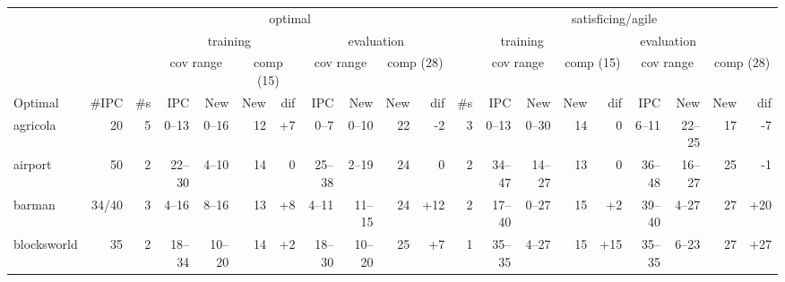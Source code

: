 \documentclass{article}
\begin{document}
                
                        \begin{table} \centering \scriptsize \setlength{\tabcolsep}{2pt}
                        \begin{tabular}{l@{}rr|rrrr|rrrr|r|rrrr|rrrr}
& & \multicolumn{9}{c}{optimal} & \multicolumn{9}{c}{satisficing/agile} \\
\cmidrule[\lightrulewidth](){3-11}
\cmidrule[\lightrulewidth](l){12-20}
& & & \multicolumn{4}{c}{training} & \multicolumn{4}{c}{evaluation} & \multicolumn{4}{c}{training} & \multicolumn{4}{c}{evaluation}\\
\cmidrule[\lightrulewidth](){4-7}
\cmidrule[\lightrulewidth](l){8-11}
\cmidrule[\lightrulewidth](){13-16}
\cmidrule[\lightrulewidth](l){17-20}
& & & \multicolumn{2}{c}{cov range} & \multicolumn{2}{c}{comp (15)} & \multicolumn{2}{c}{cov range} & \multicolumn{2}{c}{comp (28)} & & \multicolumn{2}{c}{cov range} & \multicolumn{2}{c}{comp (15)} & \multicolumn{2}{c}{cov range} & \multicolumn{2}{c}{comp (28)} \\
\cmidrule[\lightrulewidth](){4-5}
\cmidrule[\lightrulewidth](l){6-7}
\cmidrule[\lightrulewidth](l){8-9}
\cmidrule[\lightrulewidth](l){10-11}
\cmidrule[\lightrulewidth](){13-14}
\cmidrule[\lightrulewidth](l){15-16}
\cmidrule[\lightrulewidth](l){17-18}
       Optimal &  \#IPC & \#s &      IPC &     New & New &               dif &      IPC &     New & New &                dif & \#s &       IPC &     New & New &                dif &       IPC &     New & New &                dif \\
\midrule
      agricola &     20 &   5 &    0--13 &   0--16 &  12 &  {\color{blue}+7} &     0--7 &   0--10 &  22 &    {\color{red}-2} &   3 &     0--13 &   0--30 &  14 &                  0 &     6--11 &  22--25 &  17 &    {\color{red}-7} \\
       airport &     50 &   2 &   22--30 &   4--10 &  14 &                 0 &   25--38 &   2--19 &  24 &                  0 &   2 &    34--47 &  14--27 &  13 &                  0 &    36--48 &  16--27 &  25 &    {\color{red}-1} \\
        barman &  34/40 &   3 &    4--16 &   8--16 &  13 &  {\color{blue}+8} &    4--11 &  11--15 &  24 &  {\color{blue}+12} &   2 &    17--40 &   0--27 &  15 &   {\color{blue}+2} &    39--40 &   4--27 &  27 &  {\color{blue}+20} \\
   blocksworld &     35 &   2 &   18--34 &  10--20 &  14 &  {\color{blue}+2} &   18--30 &  10--20 &  25 &   {\color{blue}+7} &   1 &    35--35 &   4--27 &  15 &  {\color{blue}+15} &    35--35 &   6--23 &  27 &  {\color{blue}+27} \\

\end{tabular}
\end{table}
\end{document}
